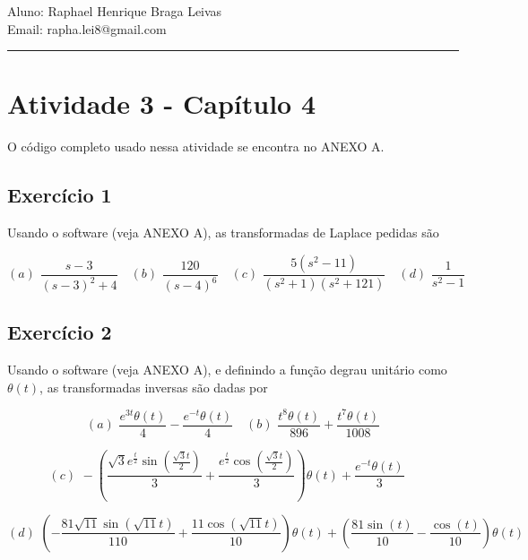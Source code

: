 \documentclass[12pt]{scrartcl}
\makeatletter
\def\today{%
  \two@digits{\the\day}/%
  \ifcase\month\or%
  01\or 02\or 03\or 04\or 05\or 06\or%
  07\or 08\or 09\or 10\or 11\or 12\fi/%
  \number\year%
}
\makeatother
\begin{document}
\pagestyle{fancy}

\fancyhead{}
\fancyhead[R]{Data: \today}
\fancyfoot{}

\begin{center}
    Aluno: Raphael Henrique Braga Leivas \\[20pt]
    Email: rapha.lei8@gmail.com
\end{center}

\hrule

\section*{Atividade 3 - Capítulo 4}

O código completo usado nessa atividade se encontra no ANEXO A.

\subsection*{Exercício 1}

Usando o software (veja ANEXO A), as transformadas de Laplace pedidas são

\[ 
(a) \,\, \frac{s - 3}{\left(s - 3\right)^{2} + 4} \quad 
(b) \,\, \frac{120}{\left(s - 4\right)^{6}} \quad 
(c) \,\, \frac{5 \left(s^{2} - 11\right)}{\left(s^{2} + 1\right) \left(s^{2} + 121\right)} \quad 
(d) \,\, \frac{1}{s^{2} - 1} 
\]

\subsection*{Exercício 2}

Usando o software (veja ANEXO A), e definindo a função degrau unitário como $\theta (t)$, 
as transformadas inversas são dadas por 

\[ 
(a) \,\,  \frac{e^{3 t} \theta\left(t\right)}{4} - \frac{e^{- t} \theta\left(t\right)}{4} \quad
(b) \,\, \frac{t^{8} \theta\left(t\right)}{896} + \frac{t^{7} \theta\left(t\right)}{1008} 
\]

\[ 
(c) \,\, - \left(\frac{\sqrt{3} e^{\frac{t}{2}} \sin{\left(\frac{\sqrt{3} t}{2} \right)}}{3} + \frac{e^{\frac{t}{2}} \cos{\left(\frac{\sqrt{3} t}{2} \right)}}{3}\right) \theta\left(t\right) + \frac{e^{- t} \theta\left(t\right)}{3} \quad 
\]

\[ 
(d) \,\, \left(- \frac{81 \sqrt{11} \sin{\left(\sqrt{11} t \right)}}{110} + \frac{11 \cos{\left(\sqrt{11} t \right)}}{10}\right) \theta\left(t\right) + \left(\frac{81 \sin{\left(t \right)}}{10} - \frac{\cos{\left(t \right)}}{10}\right) \theta\left(t\right) 
\]
\end{document}
